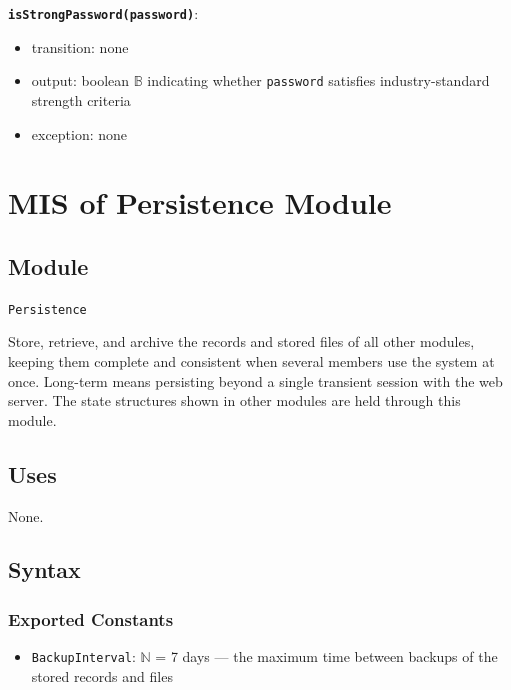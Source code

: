 \documentclass[12pt, titlepage]{article}
\begin{document}
\textbf{\texttt{isStrongPassword(password)}}:
\begin{itemize}
  \item transition: none
  \item output: boolean $\mathbb{B}$ indicating whether \texttt{password} satisfies industry-standard strength criteria
  \item exception: none
\end{itemize}

\newpage

\section{MIS of Persistence Module} \label{mPersist}

\subsection{Module}
\texttt{Persistence}

Store, retrieve, and archive the records and stored files of all other modules, keeping them complete and consistent when several members use the system at once. Long-term means persisting beyond a single transient session with the web server. The state structures shown in other modules are held through this module.

\subsection{Uses}
None.

\subsection{Syntax}

\subsubsection{Exported Constants}
\begin{itemize}
  \item \texttt{BackupInterval}: $\mathbb{N}$ = 7 days --- the maximum time between backups of the stored records and files
\end{itemize}
\end{document}
